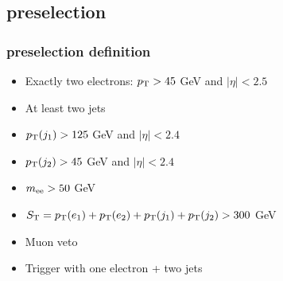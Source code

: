 \documentclass[bigger]{beamer}
\begin{document}
\subsection{\eejj preselection}
\label{sec-2-1}
\begin{frame}
\frametitle{\eejj preselection definition}
\label{sec-2-1-1}
\label{sec-2-1-1-1}

\begin{itemize}
\item Exactly two electrons: $p_{\text{T}} > 45$ GeV and  $|\eta| < 2.5$
\item At least two jets
\item $p_{\text{T}}(j_1) > 125$ GeV and $|\eta| < 2.4$
\item $p_{\text{T}}(j_2) > 45$ GeV and $|\eta| < 2.4$
\item $m_{\text{ee}} > 50$ GeV
\item $S_{\text{T}} = p_{\text{T}}(e_1) + p_{\text{T}}(e_2) + p_{\text{T}}(j_1) + p_{\text{T}}(j_2) > 300$ GeV
\item Muon veto
\item Trigger with one electron + two jets
\end{itemize}
\end{frame}
\end{document}
